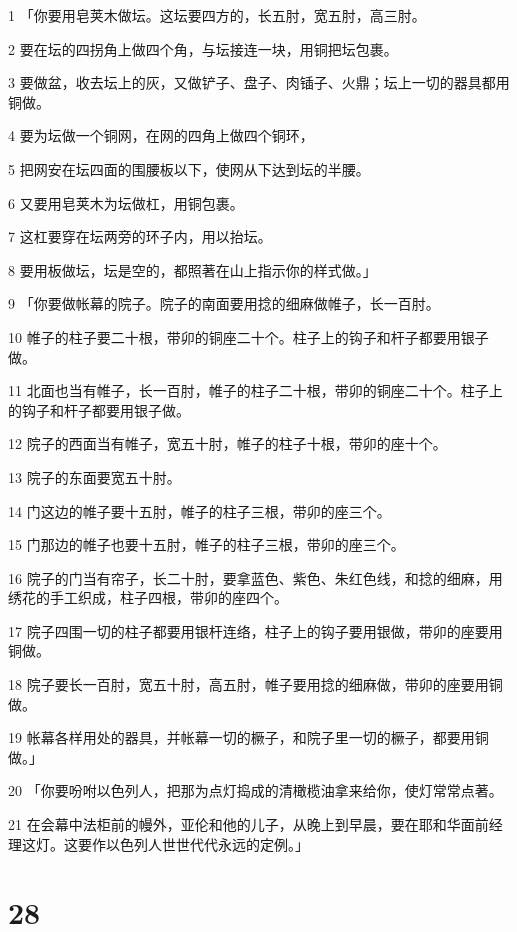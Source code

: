 \par 1 「你要用皂荚木做坛。这坛要四方的，长五肘，宽五肘，高三肘。
\par 2 要在坛的四拐角上做四个角，与坛接连一块，用铜把坛包裹。
\par 3 要做盆，收去坛上的灰，又做铲子、盘子、肉锸子、火鼎；坛上一切的器具都用铜做。
\par 4 要为坛做一个铜网，在网的四角上做四个铜环，
\par 5 把网安在坛四面的围腰板以下，使网从下达到坛的半腰。
\par 6 又要用皂荚木为坛做杠，用铜包裹。
\par 7 这杠要穿在坛两旁的环子内，用以抬坛。
\par 8 要用板做坛，坛是空的，都照著在山上指示你的样式做。」
\par 9 「你要做帐幕的院子。院子的南面要用捻的细麻做帷子，长一百肘。
\par 10 帷子的柱子要二十根，带卯的铜座二十个。柱子上的钩子和杆子都要用银子做。
\par 11 北面也当有帷子，长一百肘，帷子的柱子二十根，带卯的铜座二十个。柱子上的钩子和杆子都要用银子做。
\par 12 院子的西面当有帷子，宽五十肘，帷子的柱子十根，带卯的座十个。
\par 13 院子的东面要宽五十肘。
\par 14 门这边的帷子要十五肘，帷子的柱子三根，带卯的座三个。
\par 15 门那边的帷子也要十五肘，帷子的柱子三根，带卯的座三个。
\par 16 院子的门当有帘子，长二十肘，要拿蓝色、紫色、朱红色线，和捻的细麻，用绣花的手工织成，柱子四根，带卯的座四个。
\par 17 院子四围一切的柱子都要用银杆连络，柱子上的钩子要用银做，带卯的座要用铜做。
\par 18 院子要长一百肘，宽五十肘，高五肘，帷子要用捻的细麻做，带卯的座要用铜做。
\par 19 帐幕各样用处的器具，并帐幕一切的橛子，和院子里一切的橛子，都要用铜做。」
\par 20 「你要吩咐以色列人，把那为点灯捣成的清橄榄油拿来给你，使灯常常点著。
\par 21 在会幕中法柜前的幔外，亚伦和他的儿子，从晚上到早晨，要在耶和华面前经理这灯。这要作以色列人世世代代永远的定例。」

\chapter{28}

